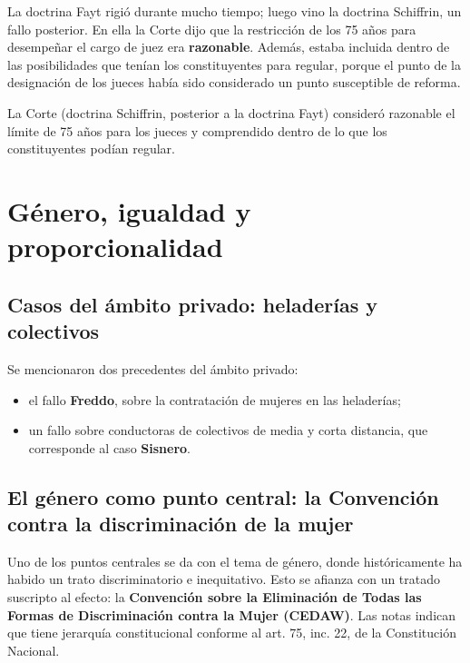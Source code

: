 \documentclass[12pt,oneside]{book}
\begin{document}
La doctrina Fayt rigió durante mucho tiempo; luego vino la doctrina Schiffrin, un fallo posterior. En ella la Corte dijo que la restricción de los 75 años para desempeñar el cargo de juez era \textbf{razonable}. Además, estaba incluida dentro de las posibilidades que tenían los constituyentes para regular, porque el punto de la designación de los jueces había sido considerado un punto susceptible de reforma.


\begin{important}
La Corte (doctrina Schiffrin, posterior a la doctrina Fayt) consideró razonable el límite de 75 años para los jueces y comprendido dentro de lo que los constituyentes podían regular.
\end{important}

\section{Género, igualdad y proporcionalidad}

\subsection{Casos del ámbito privado: heladerías y colectivos}

Se mencionaron dos precedentes del ámbito privado:
\begin{itemize}
    \item el fallo \textbf{Freddo}, sobre la contratación de mujeres en las heladerías;
    \item un fallo sobre conductoras de colectivos de media y corta distancia, que corresponde al caso \textbf{Sisnero}.
\end{itemize}


\subsection{El género como punto central: la Convención contra la discriminación de la mujer}

Uno de los puntos centrales se da con el tema de género, donde históricamente ha habido un trato discriminatorio e inequitativo. Esto se afianza con un tratado suscripto al efecto: la \textbf{Convención sobre la Eliminación de Todas las Formas de Discriminación contra la Mujer (CEDAW)}. Las notas indican que tiene jerarquía constitucional conforme al art. 75, inc. 22, de la Constitución Nacional.
\end{document}
